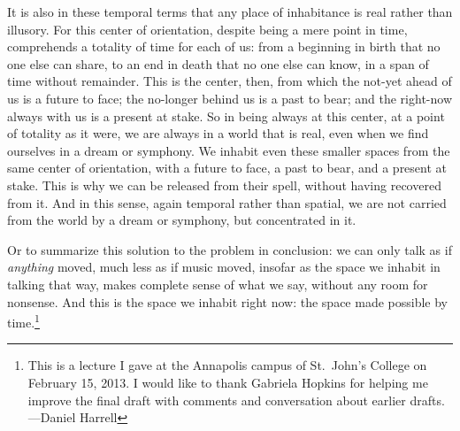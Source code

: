 \documentclass[12pt]{memoir}
\begin{document}
It is also in these temporal terms that any place
of inhabitance is real rather than illusory. For
this center of orientation, despite being a mere
point in time, comprehends a totality of time
for each of us: from a beginning in birth that
no one else can share, to an end in death that
no one else can know, in a span of time without
remainder. This is the center, then, from which
the not-yet ahead of us is a future to face; the
no-longer behind us is a past to bear; and the
right-now always with us is a present at stake.
So in being always at this center, at a point of
totality as it were, we are always in a world that
is real, even when we find ourselves in a dream
or symphony. We inhabit even these smaller spaces
from the same center of orientation, with a future
to face, a past to bear, and a present at stake.
This is why we can be released from their spell,
without having recovered from it. And in this
sense, again temporal rather than spatial, we are
not carried from the world by a dream or symphony,
but concentrated in it.

Or to summarize this solution to the problem in conclusion: we can only
talk as if \emph{anything} moved, much less as if music moved, insofar
as the space we inhabit in talking that way, makes complete sense of
what we say, without any room for nonsense. And this is the space we
inhabit right now: the space made possible by time.\footnote{This is a
  lecture I gave at the Annapolis campus of St.~John's College on
  February 15, 2013. I would like to thank Gabriela Hopkins for helping
  me improve the final draft with comments and conversation about
  earlier drafts. ---Daniel Harrell}
  
  
\end{document}
